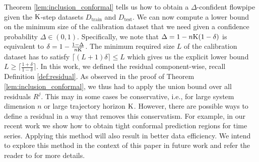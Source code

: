 Theorem \ref{lem:inclusion_conformal} tells us how to obtain a  $\Delta$-confident flowpipe given the $\mathrm{K}$-step datasets $D_{\text{train}}$ and $D_{\text{test}}$. We can now compute a lower bound on the minimum size of the calibration dataset that we need given a confidence probability $\Delta\in (0,1)$. Specifically, we note that $\Delta= 1-n\mathrm{K}(1-\delta)$  is equivalent to $\delta= 1- \frac{1-\Delta}{n\mathrm{K}}$.  The minimum required size $L$ of the calibration dataset has to satisfy $\lceil (L+1)\delta \rceil \leq L $ which gives us the explicit lower bound $L \geq \lceil \frac{1+\delta}{1-\delta} \rceil$. In this work, we defined the residual component-wise, recall Definition \ref{def:residual}. As observed in the proof of Theorem \ref{lem:inclusion_conformal}, we thus had to apply the union bound over all residuals $R^j$. This may in some cases be conservative, i.e., for large system dimension $n$ or large trajectory horizon $\mathrm{K}$. However, there are possible ways to define a residual in a way that removes this conservatism. For example, in our recent work \cite{cleaveland2023conformal} we show how to obtain tight conformal prediction regions for time series. Applying this method will also result in better data efficiency. We intend to explore this method in the context of this paper in future work and refer the reader to \cite{cleaveland2023conformal} for more details.



